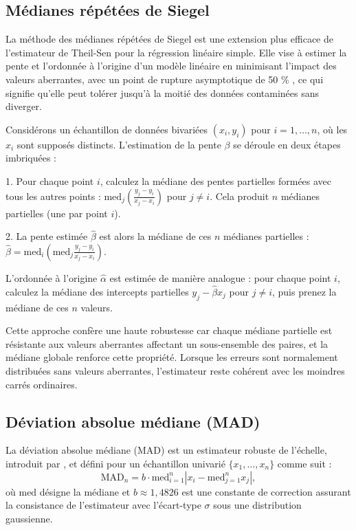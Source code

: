 \subsection{Médianes répétées de Siegel}
 La méthode des médianes répétées de Siegel \citep{siegel1982robust} est une extension plus efficace de l'estimateur de Theil-Sen pour la régression linéaire simple. Elle vise à estimer la pente et l'ordonnée à l'origine d'un modèle linéaire en minimisant l'impact des valeurs aberrantes, avec un point de rupture asymptotique de 50 \% \citep{rousseeuw2003robust}, ce qui signifie qu'elle peut tolérer jusqu'à la moitié des données contaminées sans diverger.
 
 Considérons un échantillon de données bivariées \((x_i, y_i)\) pour \(i = 1, \dots, n\), où les \(x_i\) sont supposés distincts. L'estimation de la pente \(\beta\) se déroule en deux étapes imbriquées :
 
 1. Pour chaque point \(i\), calculez la médiane des pentes partielles formées avec tous les autres points : \(\text{med}_j \left( \frac{y_j - y_i}{x_j - x_i} \right)\) pour \(j \neq i\). Cela produit \(n\) médianes partielles (une par point \(i\)).
 
 2. La pente estimée \(\hat{\beta}\) est alors la médiane de ces \(n\) médianes partielles : \(\hat{\beta} = \text{med}_i \left( \text{med}_j \frac{y_j - y_i}{x_j - x_i} \right)\).
 
 L'ordonnée à l'origine \(\hat{\alpha}\) est estimée de manière analogue : pour chaque point \(i\), calculez la médiane des intercepts partielles \(y_j - \hat{\beta} x_j\) pour \(j \neq i\), puis prenez la médiane de ces \(n\) valeurs.
 
 Cette approche confère une haute robustesse car chaque médiane partielle est résistante aux valeurs aberrantes affectant un sous-ensemble des paires, et la médiane globale renforce cette propriété. Lorsque les erreurs sont normalement distribuées sans valeurs aberrantes, l'estimateur reste cohérent avec les moindres carrés ordinaires.
 
 \subsection{Déviation absolue médiane (MAD)}
 
 La déviation absolue médiane (MAD) est un estimateur robuste de l'échelle, introduit par \citep{hampel1974influence}, et défini pour un échantillon univarié $\{x_1, \dots, x_n\}$ comme suit :
 \[
 \mathrm{MAD}_n = b \cdot \mathrm{med}_{i=1}^n |x_i - \mathrm{med}_{j=1}^n x_j|,
 \]
 où $\mathrm{med}$ désigne la médiane et $b \approx 1,4826$ est une constante de correction assurant la consistance de l'estimateur avec l'écart-type $\sigma$ sous une distribution gaussienne.
 
